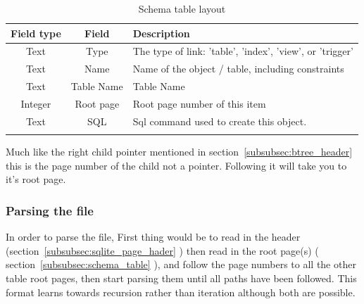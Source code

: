 \begin{longtable}[h]{| c | c| p{10cm} |}
		\hline
			\textbf{Field type} & \textbf{Field} & \textbf{Description} \\ 
		\hline
		\endhead
			Text & Type & The type of link: 'table', 'index', 'view', or 'trigger' \\
		\hline
			Text & Name & Name of the object / table, including constraints \\
		\hline
			Text & Table Name & Table Name \\
		\hline
			Integer & Root page & Root page number of this item \\
		\hline
			Text & SQL & Sql command used to create this object. \\
		\hline
	\caption{Schema table layout}
	\label{tbl:schema_table}
\end{longtable}

Much like the right child pointer mentioned in section~\ref{subsubsec:btree_header} this is the page number of the child not a pointer. Following it will take you to it's root page.


\subsubsection{Parsing the file}
\label{subsubsec:parsing the file}

In order to parse the file, First thing would be to read in the header (section~\ref{subsubsec:sqlite_page_hader} ) then read in the root page(s) ( section~\ref{subsubsec:schema_table} ), and follow the page numbers to all the other table root pages, then start parsing them until all paths have been followed. This format learns towards recursion rather than iteration although both are possible.